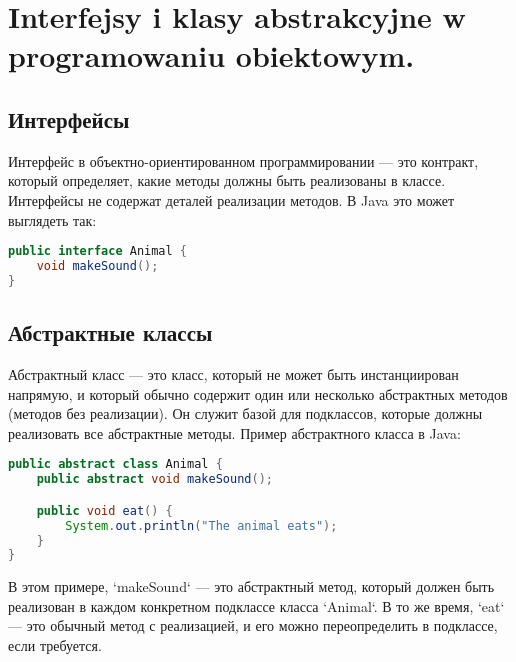 \section{Interfejsy i klasy abstrakcyjne w programowaniu obiektowym.}



\subsection*{Интерфейсы}

Интерфейс в объектно-ориентированном программировании — это контракт, который определяет, какие методы должны быть реализованы в классе. Интерфейсы не содержат деталей реализации методов. В Java это может выглядеть так:

\begin{lstlisting}[language=Java]
public interface Animal {
    void makeSound();
}
\end{lstlisting}

\subsection*{Абстрактные классы}

Абстрактный класс — это класс, который не может быть инстанциирован напрямую, и который обычно содержит один или несколько абстрактных методов (методов без реализации). Он служит базой для подклассов, которые должны реализовать все абстрактные методы. Пример абстрактного класса в Java:

\begin{lstlisting}[language=Java]
public abstract class Animal {
    public abstract void makeSound();

    public void eat() {
        System.out.println("The animal eats");
    }
}
\end{lstlisting}

В этом примере, `makeSound` — это абстрактный метод, который должен быть реализован в каждом конкретном подклассе класса `Animal`. В то же время, `eat` — это обычный метод с реализацией, и его можно переопределить в подклассе, если требуется.

